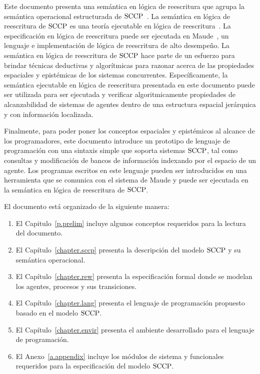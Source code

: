 Este documento presenta una sem\'antica en l\'ogica de reescritura que agrupa la sem\'antica operacional estructurada de $\textnormal{SCCP}$~\cite{knight:hal-00761116}. La sem\'antica en l\'ogica de reescritura de $\textnormal{SCCP}$ es una teor\'ia ejecutable en l\'ogica de reescritura~\cite{Meseguer199273}. La especificaci\'on en l\'ogica de reescritura puede ser ejecutada en Maude~\cite{maude-book}, un lenguaje e implementaci\'on de l\'ogica de reescritura de alto desempe\~no. La sem\'antica en l\'ogica de reescritura de $\textnormal{SCCP}$ hace parte de un esfuerzo para brindar t\'ecnicas deductivas y algor\'itmicas para razonar acerca de las propiedades espaciales y epist\'emicas de los sistemas concurrentes. Espec\'ificamente, la sem\'antica ejecutable en l\'ogica de reescritura presentada en este documento puede ser utilizada para ser ejecutada y verificar algoritmicamente propiedades de alcanzabilidad de sistemas de agentes dentro de una estructura espacial jer\'arquica y con informaci\'on localizada.

Finalmente, para poder poner los conceptos espaciales y epist\'emicos al alcance de los programadores, este documento introduce un prototipo de lenguaje de programaci\'on con una sintaxis simple que soporta sistemas $\textnormal{SCCP}$, tal como consultas y modificaci\'on de bancos de informaci\'on indexando por el espacio de un agente. Los programas escritos en este lenguaje pueden ser introducidos en una herramienta que se comunica con el sistema de Maude y puede ser ejecutada en la sem\'antica en l\'ogica de reescritura de $\textnormal{SCCP}$.

El documento est\'a organizado de la siguiente manera:
\begin{enumerate}
\item El Capitulo~\ref{p.prelim} incluye algunos conceptos requeridos para la lectura del documento.
\item El Cap\'itulo~\ref{chapter.sccp} presenta la descripci\'on del modelo $\textnormal{SCCP}$ y su sem\'antica operacional.
\item El Cap\'itulo~\ref{chapter.rew} presenta la especificaci\'on formal donde se modelan los agentes, procesos y sus transiciones. 
\item El Cap\'itulo~\ref{chapter.lang} presenta el lenguaje de programaci\'on propuesto basado en el modelo $\textnormal{SCCP}$.
\item El Cap\'itulo~\ref{chapter.envir} presenta el ambiente desarrollado para el lenguaje de programaci\'on.
\item El Anexo~\ref{a.appendix} incluye los m\'odulos de sistema y funcionales requeridos para la especificaci\'on del modelo $\textnormal{SCCP}$.
\end{enumerate}
